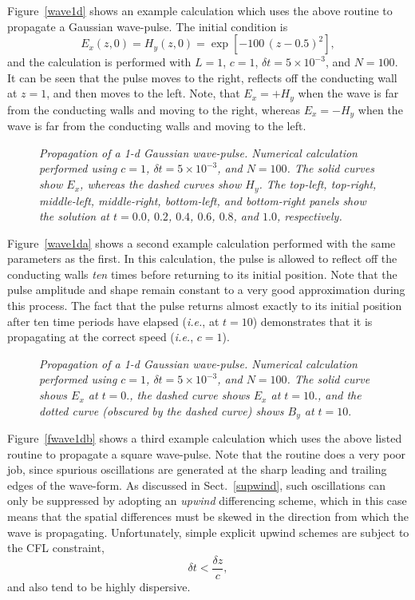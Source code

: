 Figure~\ref{wave1d} shows an example calculation which uses the above routine to
propagate a Gaussian wave-pulse. The initial condition is
\begin{equation}
E_x(z,0) =  H_y(z,0) = \exp[-100\,(z-0.5)^2],
\end{equation}
and the calculation is performed with $L=1$, $c=1$, $\delta t = 5\times 10^{-3}$, and $N=100$.
It can be seen that the pulse moves to the right, reflects off the conducting wall
at $z=1$, and then moves to the left. Note, that $E_x=+H_y$ when the wave is far
from the conducting walls and
moving to the right, whereas $E_x=-H_y$ when the wave is far
from the conducting walls and
moving to the left.

\begin{figure}
\epsfysize=5in
\centerline{}
\caption{\em Propagation of a 1-d Gaussian wave-pulse.
Numerical  calculation performed using
$c=1$, $\delta t = 5\times 10^{-3}$, and $N=100$.  The
solid curves show $E_x$, whereas the dashed curves show $H_y$. The
top-left, top-right, middle-left, middle-right, bottom-left, and
bottom-right panels show the solution at $t=0.0$, $0.2$, $0.4$, $0.6$, $0.8$,
and $1.0$, respectively. }\label{fwave1d}
\end{figure}

Figure~\ref{wave1da} shows a second example calculation performed with the
same parameters as the first. In this calculation, the pulse is allowed to reflect
off the conducting walls {\em ten} times before returning to its initial position. Note
that the pulse amplitude and shape remain constant to a very good approximation during
this process. The fact that the pulse returns almost exactly to its initial position
after ten time periods have elapsed ({\em i.e.}, at $t=10$) 
demonstrates that it is propagating at the
correct speed ({\em i.e.}, $c=1$).

\begin{figure}
\epsfysize=3in
\centerline{}
\caption{\em Propagation of a 1-d Gaussian wave-pulse.
Numerical  calculation performed using
$c=1$, $\delta t = 5\times 10^{-3}$, and $N=100$.
The solid curve shows $E_x$ at $t=0.$, the dashed curve shows $E_x$ at $t=10.$,
and the dotted curve (obscured by the dashed curve) shows $B_y$ at $t=10.$}\label{fwave1da}
\end{figure}

Figure~\ref{fwave1db} shows a third example calculation which uses the above listed routine to
propagate a square wave-pulse. Note that the routine does a very poor job, since
spurious oscillations are generated at the sharp leading and trailing edges of
the wave-form. As discussed in Sect.~\ref{supwind}, such oscillations can
only be suppressed by adopting an {\em upwind} differencing scheme, which in this
case means that the spatial differences must be skewed in the direction from
which the wave is propagating. Unfortunately, simple  explicit upwind schemes are
subject to the CFL constraint,
\begin{equation}
\delta t < \frac{\delta z}{c},
\end{equation}
and also tend to be highly dispersive.

